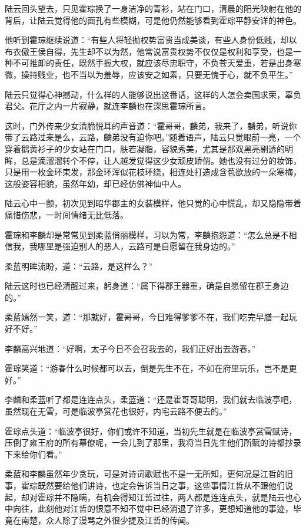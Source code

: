 陆云回头望去，只见霍琮换了一身洁净的青衫，站在门口，清晨的阳光映射在他的背后，让陆云觉得他的面孔有些模糊，可是他仍然能够看到霍琮平静安详的神色。

他听到霍琮继续说道：“有些人将轻抛权势富贵当成美谈，有些人身份低贱，却以布衣傲王侯自得，先生却不以为然，他常说富贵权势不仅仅是权利和享受，也是一种不可推卸的责任，既然手握大权，就应该尽忠职守，不负苍天爱重，若是出身寒微，操持贱业，也不当以为羞辱，应该安之如素，只要无愧于心，就不负平生。”

陆云只觉得心神撼动，什么样的人能够说出这番话，这样的人怎会卖国求荣，辜负君父。花厅之内一片寂静，就连李麟也在深思霍琮所言。

这时，门外传来少女清脆悦耳的声音道：“霍哥哥，麟弟，我来了，麟弟，听说你带了云路过来是么，云路，麟弟没有迫你吧。”随着语声，陆云只觉眼前一亮，一个穿着鹅黄衫子的少女站在门口，肤若凝脂，容貌秀美，尤其是那双黑亮剔透的明眸，总是滴溜溜转个不停，让人越发觉得这少女顽皮娇俏。她也没有过分的妆饰，只是用一枚金环束发，那金环浑似花枝环绕，相连处打造成含苞欲放的一朵寒梅，这般姿容相貌，虽然年幼，却已经仿佛神仙中人。

陆云心中一颤，初次见到昭华郡主的女装模样，他只觉的心中慌乱，却又隐隐带着痛惜伤悲，一时间情绪无比低落。

霍琮和李麟却是常常见到柔蓝俏丽模样，习以为常，李麟抱怨道：“怎么总是不相信我，我哪里是强迫别人的恶人，云路可是自愿留在我身边的。”

柔蓝明眸流盼，道：“云路，是这样么？”

陆云这时也已经清醒过来，躬身道：“属下得郡王器重，确是自愿留在郡王身边的。”

柔蓝嫣然一笑，道：“那就好，霍哥哥，今日难得爹爹不在，我们吃完早膳一起玩好不好。”

李麟高兴地道：“好啊，太子今日不会召我去的，我们正好出去游春。”

霍琮笑道：“游春什么时候都可以去，倒是先生不在，不如在府里玩乐，岂不是更好。”

李麟和柔蓝听了都是连连点头，柔蓝道：“还是霍哥哥聪明，我们就去临波亭吧，虽然现在无雪，可是临波亭赏花也很好，内宅云路不便去的。”

霍琮点头道：“临波亭很好，你们或许不知道，当初先生就是在临波亭赏雪赋诗，压倒了雍王府的所有幕僚呢，一会儿到了那里，我将当日先生他们所赋的诗都抄录下来给你们看。”

柔蓝和李麟虽然年少贪玩，可是对诗词歌赋也不是一无所知，更何况是江哲的旧事，霍琮既然要给他们讲诗，也定会告诉当日之事，这些事情江哲从不跟他们说起，却对霍琮并不隐瞒，有机会得知江哲过往，两人都是连连点头，就是陆云也心中向往，此刻他对江哲的恨意不知不觉中已经消退了许多，更想知道他的事迹，毕竟在南楚，众人除了漫骂之外很少提及江哲的传闻。


